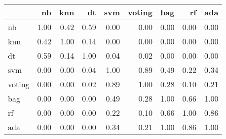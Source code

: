 \begin{tabular}{lrrrrrrrr}
\toprule
{} &   nb &  knn &   dt &  svm &  voting &  bag &   rf &  ada \\
\midrule
nb     & 1.00 & 0.42 & 0.59 & 0.00 &    0.00 & 0.00 & 0.00 & 0.00 \\
knn    & 0.42 & 1.00 & 0.14 & 0.00 &    0.00 & 0.00 & 0.00 & 0.00 \\
dt     & 0.59 & 0.14 & 1.00 & 0.04 &    0.02 & 0.00 & 0.00 & 0.00 \\
svm    & 0.00 & 0.00 & 0.04 & 1.00 &    0.89 & 0.49 & 0.22 & 0.34 \\
voting & 0.00 & 0.00 & 0.02 & 0.89 &    1.00 & 0.28 & 0.10 & 0.21 \\
bag    & 0.00 & 0.00 & 0.00 & 0.49 &    0.28 & 1.00 & 0.66 & 1.00 \\
rf     & 0.00 & 0.00 & 0.00 & 0.22 &    0.10 & 0.66 & 1.00 & 0.86 \\
ada    & 0.00 & 0.00 & 0.00 & 0.34 &    0.21 & 1.00 & 0.86 & 1.00 \\
\bottomrule
\end{tabular}
